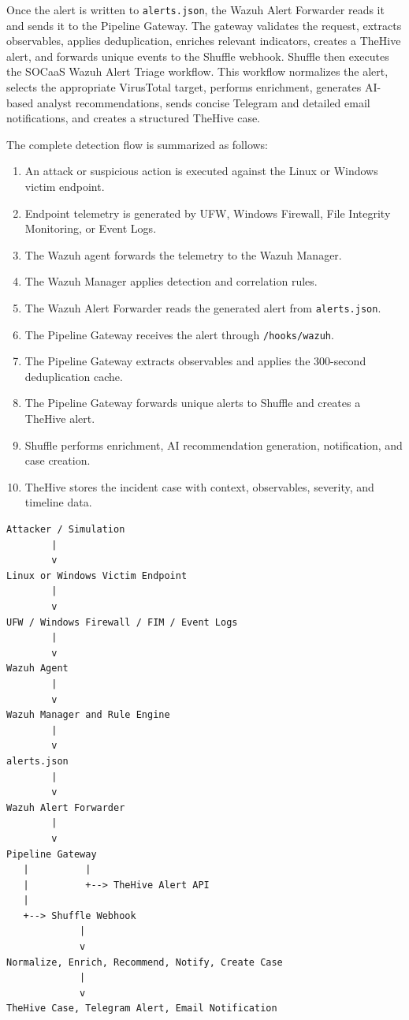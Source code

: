 Once the alert is written to \texttt{alerts.json}, the Wazuh Alert Forwarder reads it and sends it to the Pipeline Gateway. The gateway validates the request, extracts observables, applies deduplication, enriches relevant indicators, creates a TheHive alert, and forwards unique events to the Shuffle webhook. Shuffle then executes the SOCaaS Wazuh Alert Triage workflow. This workflow normalizes the alert, selects the appropriate VirusTotal target, performs enrichment, generates AI-based analyst recommendations, sends concise Telegram and detailed email notifications, and creates a structured TheHive case.

The complete detection flow is summarized as follows:

\begin{enumerate}
    \item An attack or suspicious action is executed against the Linux or Windows victim endpoint.
    \item Endpoint telemetry is generated by UFW, Windows Firewall, File Integrity Monitoring, or Event Logs.
    \item The Wazuh agent forwards the telemetry to the Wazuh Manager.
    \item The Wazuh Manager applies detection and correlation rules.
    \item The Wazuh Alert Forwarder reads the generated alert from \texttt{alerts.json}.
    \item The Pipeline Gateway receives the alert through \texttt{/hooks/wazuh}.
    \item The Pipeline Gateway extracts observables and applies the 300-second deduplication cache.
    \item The Pipeline Gateway forwards unique alerts to Shuffle and creates a TheHive alert.
    \item Shuffle performs enrichment, AI recommendation generation, notification, and case creation.
    \item TheHive stores the incident case with context, observables, severity, and timeline data.
\end{enumerate}

\begin{verbatim}
Attacker / Simulation
        |
        v
Linux or Windows Victim Endpoint
        |
        v
UFW / Windows Firewall / FIM / Event Logs
        |
        v
Wazuh Agent
        |
        v
Wazuh Manager and Rule Engine
        |
        v
alerts.json
        |
        v
Wazuh Alert Forwarder
        |
        v
Pipeline Gateway
   |          |
   |          +--> TheHive Alert API
   |
   +--> Shuffle Webhook
             |
             v
Normalize, Enrich, Recommend, Notify, Create Case
             |
             v
TheHive Case, Telegram Alert, Email Notification
\end{verbatim}

